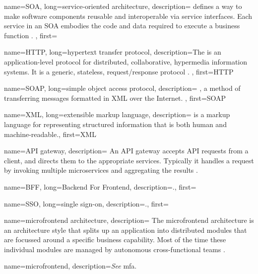 {
    name=SOA, 
    long={service-oriented architecture},
    description={
     defines a way to make software components reusable and
    interoperable via service interfaces. Each service in an SOA embodies the
    code and data required to execute a business function \autocite{IBM_2021}.
    },
    first=
}

{
    name=HTTP,
    long={hypertext transfer protocol},
    description={The  is an application-level
    protocol for distributed, collaborative, hypermedia information
    systems. It is a generic, stateless, request/response protocol
    \autocite{Fielding_etal_1999}.
    },
    first=HTTP %
}

{
    name=SOAP, 
    long={simple object access protocol},
    description={
    , a method of transferring messages formatted in XML over
    the Internet.
    },
    first=SOAP
}

{
    name=XML,
    long={extensible markup language},
    description={ is a markup language for representing
    structured information that is both human and machine-readable.},
    first=XML
}


{  
    name=API gateway, 
    description={
    An API gateway accepts API requests from a client, and directs them to the
    appropriate services. Typically it handles a request by invoking multiple
    microservices and aggregating the results \autocite{Nginx_2021}.
    }
}


{
    name=BFF,
    long={Backend For Frontend},
    description={.},
    first=
}

{
    name=SSO,
    long={single sign-on},
    description={.},
    first=
}

{
    name={microfrontend architecture}, 
    description={
    The microfrontend architecture is an architecture style that splits up an
    application into distributed modules that are focussed around a specific
    business capability. Most of the time these individual modules are managed
    by autonomous cross-functional teams \autocite{Geers_2020}\autocite{Rappl_2021}.
    }   
}

{
    name=microfrontend, 
    description={\textit{See} \gls{mfa}.}   
}

